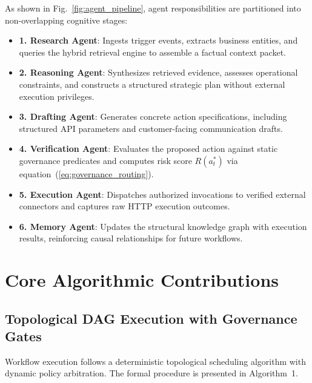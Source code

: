 \documentclass[conference]{IEEEtran}
\begin{document}
As shown in Fig.~\ref{fig:agent_pipeline}, agent responsibilities are partitioned into non-overlapping cognitive stages:
\begin{itemize}
    \item \textbf{1. Research Agent}: Ingests trigger events, extracts business entities, and queries the hybrid retrieval engine to assemble a factual context packet.
    \item \textbf{2. Reasoning Agent}: Synthesizes retrieved evidence, assesses operational constraints, and constructs a structured strategic plan without external execution privileges.
    \item \textbf{3. Drafting Agent}: Generates concrete action specifications, including structured API parameters and customer-facing communication drafts.
    \item \textbf{4. Verification Agent}: Evaluates the proposed action against static governance predicates and computes risk score $R(a_t^*)$ via equation~(\ref{eq:governance_routing}).
    \item \textbf{5. Execution Agent}: Dispatches authorized invocations to verified external connectors and captures raw HTTP execution outcomes.
    \item \textbf{6. Memory Agent}: Updates the structural knowledge graph with execution results, reinforcing causal relationships for future workflows.
\end{itemize}

\section{Core Algorithmic Contributions}

\subsection{Topological DAG Execution with Governance Gates}
Workflow execution follows a deterministic topological scheduling algorithm with dynamic policy arbitration. The formal procedure is presented in Algorithm~1.
\end{document}
